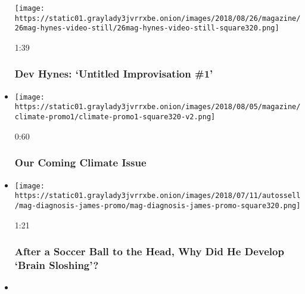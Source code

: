 \begin{itemize}
  \texttt{[image: https://static01.graylady3jvrrxbe.onion/images/2018/08/26/magazine/26mag-hynes-video-still/26mag-hynes-video-still-square320.png]}

  1:39

  \hypertarget{dev-hynes-untitled-improvisation-1}{%
  \subsubsection{Dev Hynes: `Untitled Improvisation
  \#1'}\label{dev-hynes-untitled-improvisation-1}}
\item
  \href{https://www.nytimes3xbfgragh.onion/video/magazine/100000006025347/our-coming-climate-issue.html?action=click\&module=video-series-bar\&region=header\&pgtype=Article\&playlistId=video/magazine}{}

  \texttt{[image: https://static01.graylady3jvrrxbe.onion/images/2018/08/05/magazine/climate-promo1/climate-promo1-square320-v2.png]}

  0:60

  \hypertarget{our-coming-climate-issue}{%
  \subsubsection{Our Coming Climate
  Issue}\label{our-coming-climate-issue}}
\item
  \href{https://www.nytimes3xbfgragh.onion/video/magazine/100000006000313/after-taking-a-soccer-ball-to-the-head-an-18-year-old-student-develops-a-mental-fogginess.html?action=click\&module=video-series-bar\&region=header\&pgtype=Article\&playlistId=video/magazine}{}

  \texttt{[image: https://static01.graylady3jvrrxbe.onion/images/2018/07/11/autossell/mag-diagnosis-james-promo/mag-diagnosis-james-promo-square320.png]}

  1:21

  \hypertarget{after-a-soccer-ball-to-the-head-why-did-he-develop-brain-sloshing}{%
  \subsubsection{After a Soccer Ball to the Head, Why Did He Develop
  `Brain
  Sloshing'?}\label{after-a-soccer-ball-to-the-head-why-did-he-develop-brain-sloshing}}
\item
  \href{https://www.nytimes3xbfgragh.onion/video/magazine/100000005939102/new-york-issue-behind-the-scenes.html?action=click\&module=video-series-bar\&region=header\&pgtype=Article\&playlistId=video/magazine}{}


\end{itemize}
